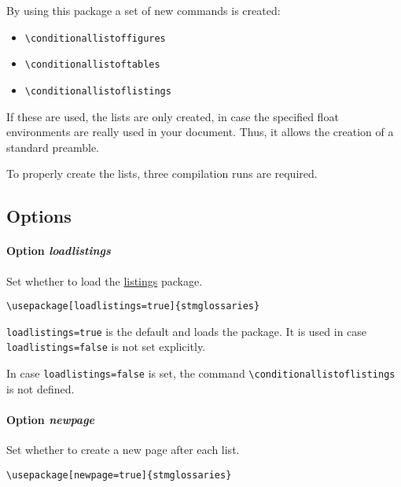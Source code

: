 \documentclass[%
  type=article,%
  layout=koma,%
  hyperref=true,%
  conditionallox=false,%
  date=true,%
  listings=true%
]{stmtext}
\begin{document}

By using this package a set of new commands is created:

\begin{itemize}
  \item \verb+\conditionallistoffigures+
  \item \verb+\conditionallistoftables+
  \item \verb+\conditionallistoflistings+
\end{itemize}

If these are used, the lists are only created, in case the specified float environments are really used in your document. Thus, it allows the creation of a standard preamble.

To properly create the lists, three compilation runs are required.

\subsection{Options}

\paragraph{Option \protect\textit{loadlistings}}

Set whether to load the \href{https://ctan.org/pkg/listings}{listings} package.

\begin{verbatim}
\usepackage[loadlistings=true]{stmglossaries}
\end{verbatim}

\texttt{loadlistings=true} is the default and loads the package. It is used in case \texttt{loadlistings=false} is not set explicitly.

In case \texttt{loadlistings=false} is set, the command \verb+\conditionallistoflistings+ is not defined.

\paragraph{Option \protect\textit{newpage}}

Set whether to create a new page after each list.

\begin{verbatim}
\usepackage[newpage=true]{stmglossaries}
\end{verbatim}
\end{document}
